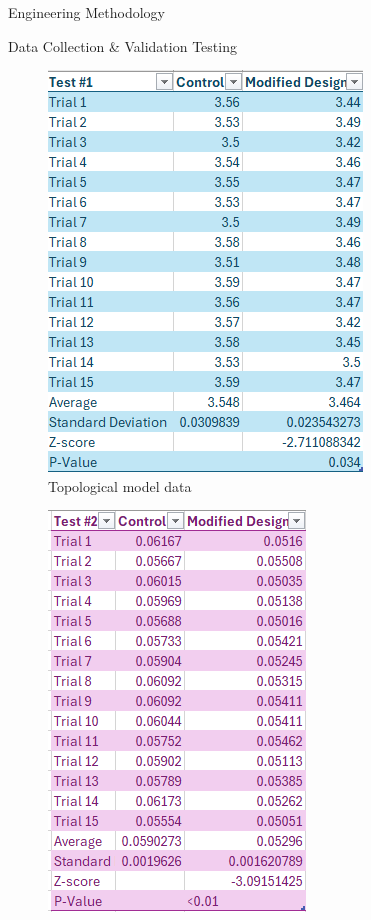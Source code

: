 \documentclass[final, 16pt]{beamer}
\newlength{\colwidth}
\newlength{\twocolwidth}
\begin{document}
\begin{frame}[t]
\begin{columns}[t]
\begin{column}{\twocolwidth}
\begin{block}{Engineering Methodology}
  \end{block}

  \begin{multicols}{2}
  \begin{block}{Data Collection \& Validation Testing}
      \begin{multicols}{2}
      \begin{figure}
       \centering
        \includegraphics[scale=1.50]{img/Topological_Model_Table.png}
        \caption{Topological model data}
        \label{fig:topological-table}
      \end{figure}
      \begin{figure}
        \centering
        \vspace*{0.25cm}
         \includegraphics[scale=1.50]{img/Propulsion_Model_Table.png}

\end{figure}
\end{multicols}
\end{block}
\end{multicols}
\end{column}
\end{columns}
\end{frame}
\end{document}
